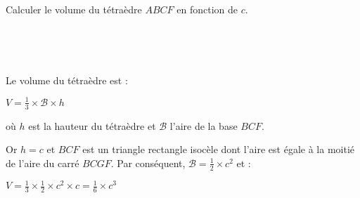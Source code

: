 
%

\begin{center}
\end{center}
Calculer le volume du tétraèdre $ABCF$ en fonction de $c$.
\par
~
\begin{corrige}
     ~
     \par
     Le volume du tétraèdre est :
     \par
     $V=\frac{1}{3}\times \mathscr B\times h$
     \par
     où $h$ est la hauteur du tétraèdre et $\mathscr B$ l'aire de la base $BCF$.
     \par
     Or $h=c$ et $BCF$ est un triangle rectangle isocèle dont l'aire est égale à la moitié de l'aire du carré $BCGF$. Par conséquent, $\mathscr B=\frac{1}{2}\times c^{2}$ et :
     \par
     $V=\frac{1}{3}\times \frac{1}{2}\times c^{2}\times c=\frac{1}{6}\times c^{3}$
\end{corrige}
